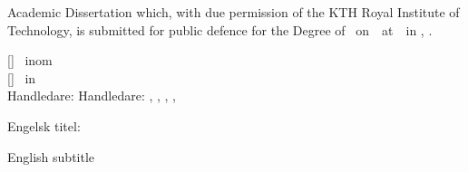{\begin{flushleft}
{Academic Dissertation which, with due permission of the KTH Royal Institute of Technology, is submitted for public defence for the Degree of \fullDegreeName{\@degreeName}\ on\  \ at\ \ in \@presentationRoom, \@presentationAddress.%
\fi
}
\end{flushleft}
\vfill

\begin{flushleft}
{  \FigtreeFont\fontsize{8}{10}\selectfont
\ifinswedish
  []%
\ inom \@subjectArea\\
  \else
  []%
\ in \@subjectArea\\

\fi
  \ifinswedish
    \ifx\@supervisorBsLastname\@empty
    Handledare: \@supervisorAsFirstname\space\@supervisorAsLastname
        \else
    Handledare: \@supervisorAsFirstname\space\@supervisorAsLastname,  \@supervisorBsFirstname\space\@supervisorBsLastname
        \fi
    \ifx\@supervisorCsLastname\@empty
    \else
    , \@supervisorDsFirstname\space\@supervisorCsLastname
    \fi
    \ifx\@supervisorCsLastname\@empty
    \else
    , \@supervisorDsFirstname\space\@supervisorDsLastname
    \fi
    \ifx\@supervisorEsLastname\@empty
    \else
    , \@supervisorEsFirstname\space\@supervisorEsLastname
    \fi
    \par


    \ifx\@alttitle\empty\relax\else Engelsk titel: %
    \begin{otherlanguage}{english}\sffamily\@alttitle\end{otherlanguage} \fi
    \ifx\@altsubtitle\@empty\relax
    \else
    English subtitle \begin{otherlanguage}{english}\sffamily\@altsubtitle\end{otherlanguage} \\
    \fi
  \else

}
\end{flushleft}}

